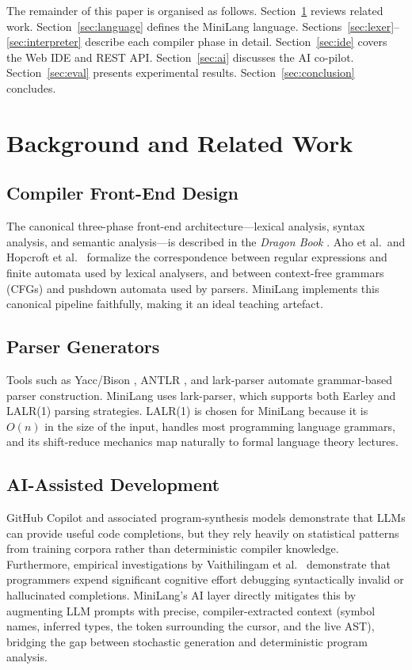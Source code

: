 \documentclass[conference]{IEEEtran}
\begin{document}
The remainder of this paper is organised as follows.
Section~\ref{sec:background} reviews related work.
Section~\ref{sec:language} defines the MiniLang language.
Sections~\ref{sec:lexer}--\ref{sec:interpreter} describe each compiler
phase in detail.
Section~\ref{sec:ide} covers the Web IDE and REST API.
Section~\ref{sec:ai} discusses the AI co-pilot.
Section~\ref{sec:eval} presents experimental results.
Section~\ref{sec:conclusion} concludes.

\section{Background and Related Work}
\label{sec:background}

\subsection{Compiler Front-End Design}

The canonical three-phase front-end architecture---lexical analysis,
syntax analysis, and semantic analysis---is described in the
\textit{Dragon Book} \cite{dragon_book}. Aho et al.\ and Hopcroft et
al.\ \cite{hopcroft2001} formalize the correspondence between regular
expressions and finite automata used by lexical analysers, and between
context-free grammars (CFGs) and pushdown automata used by parsers.
MiniLang implements this canonical pipeline faithfully, making it an
ideal teaching artefact.

\subsection{Parser Generators}

Tools such as Yacc/Bison \cite{yacc}, ANTLR \cite{antlr}, and
lark-parser \cite{lark} automate grammar-based parser construction.
MiniLang uses lark-parser, which supports both Earley and LALR(1)
parsing strategies. LALR(1) \cite{lalr} is chosen for MiniLang because
it is $O(n)$ in the size of the input, handles most programming
language grammars, and its shift-reduce mechanics map naturally to
formal language theory lectures.

\subsection{AI-Assisted Development}

GitHub Copilot \cite{copilot} and associated program-synthesis
models \cite{austin2021} demonstrate that LLMs can provide useful code
completions, but they rely heavily on statistical patterns from training
corpora rather than deterministic compiler knowledge. Furthermore,
empirical investigations by Vaithilingam et al.\ \cite{vaithilingam2022}
demonstrate that programmers expend significant cognitive effort
debugging syntactically invalid or hallucinated completions. MiniLang's
AI layer directly mitigates this by augmenting LLM prompts with precise,
compiler-extracted context (symbol names, inferred types, the token
surrounding the cursor, and the live AST), bridging the gap between
stochastic generation and deterministic program analysis.
\end{document}
